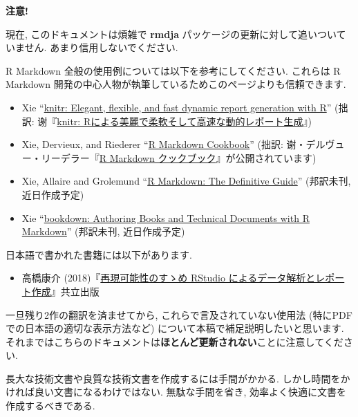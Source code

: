 \documentclass[
  xelatex,ja=standard,jafont=noto]{bxjsbook}
\providecommand{\tightlist}{%
  \setlength{\itemsep}{0pt}\setlength{\parskip}{0pt}}
\newenvironment{infobox}[1]{\begin{itemize}\renewcommand{\labelitemi}{\raisebox{-.7\height}[0pt][0pt]{%
  {\setkeys{Gin}{width=3em,keepaspectratio}\texttt{[image: \_latex/\_img/\#1]}}}}
  \setlength{\fboxsep}{1em}
  \begin{greyblock}
  \item
  }{\end{greyblock}\end{itemize}
}
\theoremstyle{definition}
\theoremstyle{definition}
\theoremstyle{definition}
\theoremstyle{definition}
\theoremstyle{remark}
\begin{document}
\begin{infobox}{caution}
\textbf{注意!}

現在, このドキュメントは煩雑で \textbf{rmdja}
パッケージの更新に対して追いついていません. あまり信用しないでください.

R Markdown 全般の使用例については以下を参考にしてください. これらは R
Markdown 開発の中心人物が執筆しているためこのページよりも信頼できます.

\begin{itemize}
\tightlist
\item
  Xie ``\href{https://yihui.org/knitr/}{knitr: Elegant, flexible, and
  fast dynamic report generation with R}'' (拙訳:
  谢『\href{https://gedevan-aleksizde.github.io/knitr-doc-ja/index.html}{knitr:
  Rによる美麗で柔軟そして高速な動的レポート生成}』)
\item
  Xie, Dervieux, and Riederer
  ``\href{https://bookdown.org/yihui/rmarkdown-cookbook/}{R Markdown
  Cookbook}'' (拙訳:
  谢・デルヴュー・リーデラー『\href{https://gedevan-aleksizde.github.io/rmarkdown-cookbook/}{R
  Markdown クックブック}』が公開されています)
\item
  Xie, Allaire and Grolemund
  ``\href{https://bookdown.org/yihui/rmarkdown/}{R Markdown: The
  Definitive Guide}'' (邦訳未刊, 近日作成予定)
\item
  Xie ``\href{https://bookdown.org/yihui/bookdown/}{bookdown: Authoring
  Books and Technical Documents with R Markdown}'' (邦訳未刊,
  近日作成予定)
\end{itemize}

日本語で書かれた書籍には以下があります.

\begin{itemize}
\tightlist
\item
  高橋康介
  (2018)『\href{https://www.kyoritsu-pub.co.jp/bookdetail/9784320112438}{再現可能性のすゝめ
  RStudio によるデータ解析とレポート作成}』共立出版
\end{itemize}

一旦残り2作の翻訳を済ませてから, これらで言及されていない使用法
(特にPDFでの日本語の適切な表示方法など)
について本稿で補足説明したいと思います.
それまではこちらのドキュメントは\textbf{ほとんど更新されない}ことに注意してください.

\end{infobox}

長大な技術文書や良質な技術文書を作成するには手間がかかる.
しかし時間をかければ良い文書になるわけではない. 無駄な手間を省き,
効率よく快適に文書を作成するべきである.
\end{document}
